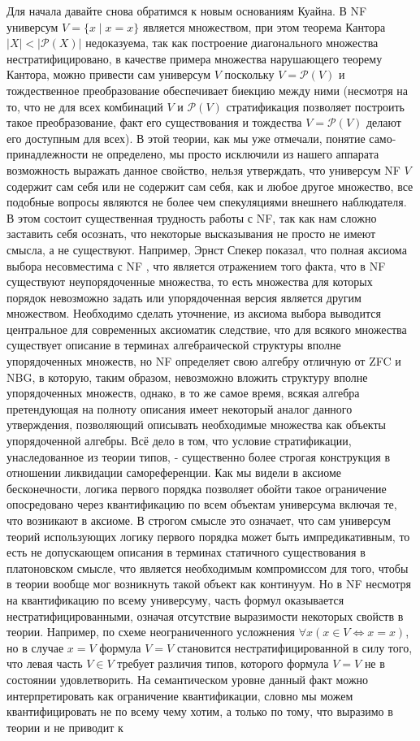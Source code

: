 \documentclass[12pt]{article}
\begin{document}
Для начала давайте снова обратимся к новым основаниям Куайна. В NF универсум $V = \{ x \mid x = x \}$ является множеством, при этом теорема Кантора $|X| < |\mathcal{P}(X)|$ недоказуема, так как построение диагонального множества нестратифицировано, в качестве примера множества нарушающего теорему Кантора, можно привести сам универсум $V$ поскольку $V = \mathcal{P}(V)$ и тождественное преобразование обеспечивает биекцию между ними \cite{rosser-nf} (несмотря на то, что не для всех комбинаций $V$ и $\mathcal{P}(V)$ стратификация позволяет построить такое преобразование, факт его существования и тождества $V = \mathcal{P}(V)$ делают его доступным для всех). В этой теории, как мы уже отмечали, понятие само-принадлежности не определено, мы просто исключили из нашего аппарата возможность выражать данное свойство, нельзя утверждать, что универсум NF $V$ содержит сам себя или не содержит сам себя, как и любое другое множество, все подобные вопросы являются не более чем спекуляциями внешнего наблюдателя. В этом состоит существенная трудность работы с NF, так как нам сложно заставить себя осознать, что некоторые высказывания не просто не имеют смысла, а не существуют. Например, Эрнст Спекер показал, что полная аксиома выбора несовместима с NF \cite{specker}, что является отражением того факта, что в NF существуют неупорядоченные множества, то есть множества для которых порядок невозможно задать или упорядоченная версия является другим множеством. Необходимо сделать уточнение, из аксиома выбора выводится центральное для современных аксиоматик следствие, что для всякого множества существует описание в терминах алгебраической структуры вполне упорядоченных множеств, но NF определяет свою алгебру отличную от ZFC и NBG, в которую, таким образом, невозможно вложить структуру вполне упорядоченных множеств, однако, в то же самое время, всякая алгебра претендующая на полноту описания имеет некоторый аналог данного утверждения, позволяющий описывать необходимые множества как объекты упорядоченной алгебры. Всё дело в том, что условие стратификации, унаследованное из теории типов, - существенно более строгая конструкция в отношении ликвидации самореференции. Как мы видели в аксиоме бесконечности, логика первого порядка позволяет обойти такое ограничение опосредовано через квантификацию по всем объектам универсума включая те, что возникают в аксиоме. В строгом смысле это означает, что сам универсум теорий использующих логику первого порядка может быть импредикативным, то есть не допускающем описания в терминах статичного существования в платоновском смысле, что является необходимым компромиссом для того, чтобы в теории вообще мог возникнуть такой объект как континуум. Но в NF несмотря на квантификацию по всему универсуму, часть формул оказывается нестратифицированными, означая отсутствие выразимости некоторых свойств в теории. Например, по схеме неограниченного усложнения $\forall x (x \in V \Leftrightarrow x = x)$, но в случае $x = V$ формула $V = V$ становится нестратифицированной в силу того, что левая часть $V \in V$ требует различия типов, которого формула $V = V$ не в состоянии удовлетворить. На семантическом уровне данный факт можно интерпретировать как ограничение квантификации, словно мы можем квантифицировать не по всему чему хотим, а только по тому, что выразимо в теории и не приводит к 
\end{document}
